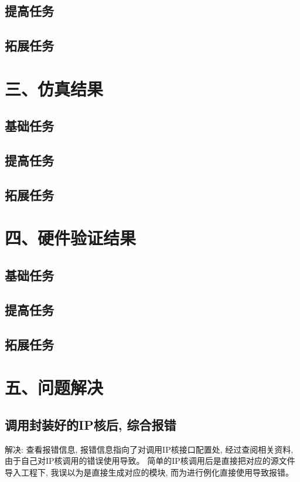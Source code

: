 \documentclass{article}
\newcommand{\fourhao}{\fontsize{14pt}{\baselineskip}\selectfont} %
\newcommand{\xiaosihao}{\fontsize{12pt}{\baselineskip}\selectfont} %
\begin{document}
\subsection*{提高任务}
\subsection*{拓展任务}
\section*{\fourhao 三、仿真结果}
\xiaosihao
{}
\subsection*{基础任务}
\subsection*{提高任务}
\subsection*{拓展任务}
\section*{\fourhao 四、硬件验证结果}
\xiaosihao
{}
\subsection*{基础任务}
\subsection*{提高任务}
\subsection*{拓展任务}
\section*{\fourhao 五、问题解决}
\xiaosihao
{}
\subsection*{调用封装好的IP核后, 综合报错}
解决: 查看报错信息, 报错信息指向了对调用IP核接口配置处, 经过查阅相关资料, 由于自己对IP核调用的错误使用导致。
简单的IP核调用后是直接把对应的源文件导入工程下, 我误以为是直接生成对应的模块, 而为进行例化直接使用导致报错。
\end{document}
